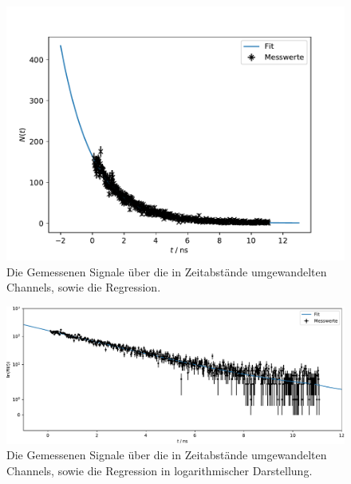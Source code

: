 \begin{figure}[h]
  \centering
  \includegraphics{myonen.pdf}
  \caption{Die Gemessenen Signale über die in Zeitabstände umgewandelten Channels, sowie die Regression.}
  \label{fig:myonen}
\end{figure}

\begin{figure}[h]
  \centering
  \includegraphics[width=1.2\textwidth]{myonen_log.pdf}
  \caption{Die Gemessenen Signale über die in Zeitabstände umgewandelten Channels, sowie die Regression in logarithmischer Darstellung.}
  \label{fig:myonen_log}
\end{figure}
